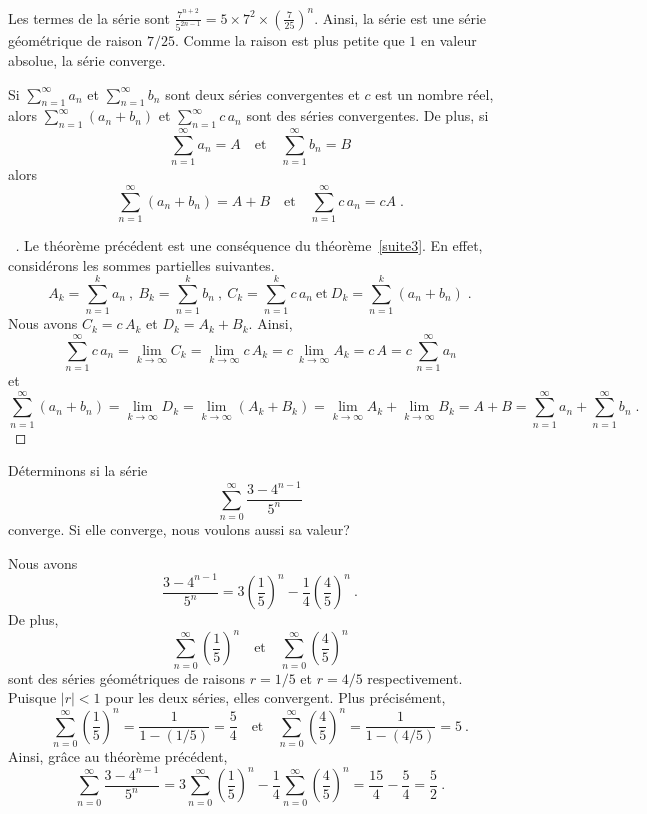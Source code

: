 {\begin{egg}
Les termes de la série sont
$\displaystyle \frac{7^{n+2}}{5^{2n-1}} = 5\times 7^2 \times
\left(\frac{7}{25}\right)^n$.  Ainsi, la série est une série
géométrique de raison $7/25$.  Comme la raison est plus petite que $1$
en valeur absolue, la série converge.
\end{egg}

\begin{theorem}
Si $\displaystyle \sum_{n=1}^\infty a_n$ et
$\displaystyle \sum_{n=1}^\infty b_n$ sont deux séries convergentes et
$c$ est un nombre réel, alors
$\displaystyle \sum_{n=1}^\infty (a_n+b_n)$ et
$\displaystyle \sum_{n=1}^\infty c\, a_n$ sont des séries convergentes.
De plus, si
\[
\sum_{n=1}^\infty a_n = A \quad \text{et} \quad \sum_{n=1}^\infty b_n = B
\]
alors
\[
\sum_{n=1}^\infty (a_n+b_n) = A+B \quad \text{et}
\quad \sum_{n=1}^\infty c\, a_n = cA \; .
\]
\label{series_linear}
\end{theorem}

\begin{proof}[\UOproof\ \theory]
Le théorème précédent est une conséquence du théorème~\ref{suite3}.
En effet, considérons les sommes partielles suivantes.
\[
A_k = \sum_{n=1}^k a_n \ , \ 
B_k = \sum_{n=1}^k b_n \ , \ C_k = \sum_{n=1}^k c\,a_n
\ \text{et} \ D_k = \sum_{n=1}^k (a_n+b_n) \; .
\]
Nous avons $C_k = c\,A_k$ et $D_k = A_k + B_k$.  Ainsi,
\[
\sum_{n=1}^\infty c\,a_n = \lim_{k\rightarrow \infty} C_k
= \lim_{k\rightarrow \infty} c\,A_k
= c\,\lim_{k\rightarrow \infty} A_k = c\, A
= c\, \sum_{n=1}^\infty a_n
\]
et
\[
\sum_{n=1}^\infty (a_n+b_n) = \lim_{k\rightarrow \infty} D_k
= \lim_{k\rightarrow \infty} (A_k + B_k)
= \lim_{k\rightarrow \infty} A_k + \lim_{k\rightarrow \infty} B_k
= A + B
= \sum_{n=1}^\infty a_n + \sum_{n=1}^\infty b_n
\; .
\]
\end{proof}

\begin{egg}[\eng]
Déterminons si la série
\[
\sum_{n=0}^\infty \frac{3-4^{n-1}}{5^n}
\]
converge.  Si elle converge, nous voulons aussi sa valeur?

Nous avons
\[
\frac{3-4^{n-1}}{5^n} =
3 \left( \frac{1}{5}\right)^n - \frac{1}{4} \left(\frac{4}{5}\right)^n \ .
\]
De plus,
\[
\sum_{n=0}^\infty \left( \frac{1}{5} \right)^n \quad \text{et}
\quad \sum_{n=0}^\infty \left( \frac{4}{5} \right)^n
\]
sont des séries géométriques de raisons $r = 1/5$ et $r = 4/5$
respectivement. Puisque $|r|<1$ pour les deux séries, elles
convergent.  Plus précisément,
\[
\sum_{n=0}^\infty \left( \frac{1}{5} \right)^n = \frac{1}{1-(1/5)} =
\frac{5}{4} \quad \text{et} \quad
\sum_{n=0}^\infty \left( \frac{4}{5} \right)^n = \frac{1}{1-(4/5)} = 5 \ .
\]
Ainsi, grâce au théorème précédent,
\[
\sum_{n=0}^\infty \frac{3-4^{n-1}}{5^n}
= 3 \sum_{n=0}^\infty \left( \frac{1}{5} \right)^n - \frac{1}{4}
\sum_{n=0}^\infty \left( \frac{4}{5} \right)^n
= \frac{15}{4} - \frac{5}{4} = \frac{5}{2} \ .
\]
\end{egg}

}
